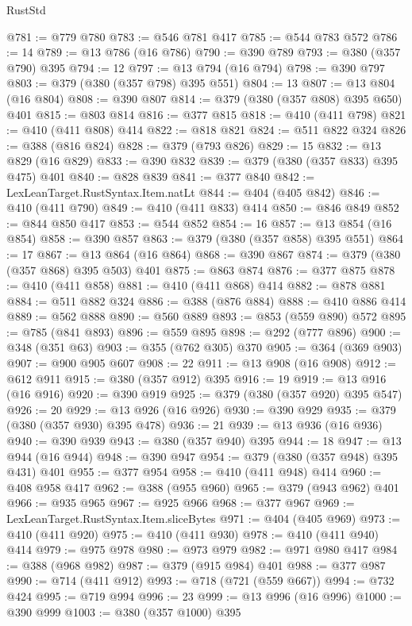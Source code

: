 \begin{lexlean}{RustStd}
\begin{coremodule}
@781 := @779 @780
@783 := @546 @781 @417
@785 := @544 @783 @572
@786 := 14
@789 := @13 @786 (@16 @786)
@790 := @390 @789
@793 := @380 (@357 @790) @395
@794 := 12
@797 := @13 @794 (@16 @794)
@798 := @390 @797
@803 := @379 (@380 (@357 @798) @395 @551)
@804 := 13
@807 := @13 @804 (@16 @804)
@808 := @390 @807
@814 := @379 (@380 (@357 @808) @395 @650) @401
@815 := @803 @814
@816 := @377 @815
@818 := @410 (@411 @798)
@821 := @410 (@411 @808) @414
@822 := @818 @821
@824 := @511 @822 @324
@826 := @388 (@816 @824)
@828 := @379 (@793 @826)
@829 := 15
@832 := @13 @829 (@16 @829)
@833 := @390 @832
@839 := @379 (@380 (@357 @833) @395 @475) @401
@840 := @828 @839
@841 := @377 @840
@842 := LexLeanTarget.RustSyntax.Item.natLt
@844 := @404 (@405 @842)
@846 := @410 (@411 @790)
@849 := @410 (@411 @833) @414
@850 := @846 @849
@852 := @844 @850 @417
@853 := @544 @852
@854 := 16
@857 := @13 @854 (@16 @854)
@858 := @390 @857
@863 := @379 (@380 (@357 @858) @395 @551)
@864 := 17
@867 := @13 @864 (@16 @864)
@868 := @390 @867
@874 := @379 (@380 (@357 @868) @395 @503) @401
@875 := @863 @874
@876 := @377 @875
@878 := @410 (@411 @858)
@881 := @410 (@411 @868) @414
@882 := @878 @881
@884 := @511 @882 @324
@886 := @388 (@876 @884)
@888 := @410 @886 @414
@889 := @562 @888
@890 := @560 @889
@893 := @853 (@559 @890) @572
@895 := @785 (@841 @893)
@896 := @559 @895
@898 := @292 (@777 @896)
@900 := @348 (@351 @63)
@903 := @355 (@762 @305) @370
@905 := @364 (@369 @903)
@907 := @900 @905 @607
@908 := 22
@911 := @13 @908 (@16 @908)
@912 := @612 @911
@915 := @380 (@357 @912) @395
@916 := 19
@919 := @13 @916 (@16 @916)
@920 := @390 @919
@925 := @379 (@380 (@357 @920) @395 @547)
@926 := 20
@929 := @13 @926 (@16 @926)
@930 := @390 @929
@935 := @379 (@380 (@357 @930) @395 @478)
@936 := 21
@939 := @13 @936 (@16 @936)
@940 := @390 @939
@943 := @380 (@357 @940) @395
@944 := 18
@947 := @13 @944 (@16 @944)
@948 := @390 @947
@954 := @379 (@380 (@357 @948) @395 @431) @401
@955 := @377 @954
@958 := @410 (@411 @948) @414
@960 := @408 @958 @417
@962 := @388 (@955 @960)
@965 := @379 (@943 @962) @401
@966 := @935 @965
@967 := @925 @966
@968 := @377 @967
@969 := LexLeanTarget.RustSyntax.Item.sliceBytes
@971 := @404 (@405 @969)
@973 := @410 (@411 @920)
@975 := @410 (@411 @930)
@978 := @410 (@411 @940) @414
@979 := @975 @978
@980 := @973 @979
@982 := @971 @980 @417
@984 := @388 (@968 @982)
@987 := @379 (@915 @984) @401
@988 := @377 @987
@990 := @714 (@411 @912)
@993 := @718 (@721 (@559 @667))
@994 := @732 @424
@995 := @719 @994
@996 := 23
@999 := @13 @996 (@16 @996)
@1000 := @390 @999
@1003 := @380 (@357 @1000) @395

\end{coremodule}
\end{lexlean}
